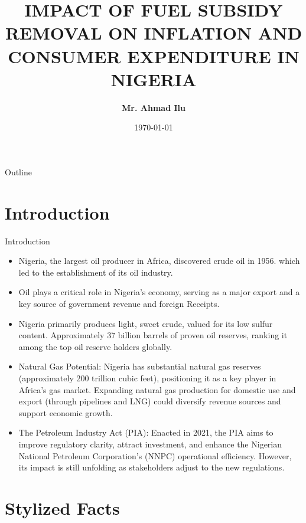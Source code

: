 \documentclass{beamer}
\title [Energy Subsidy]{IMPACT OF FUEL SUBSIDY REMOVAL ON INFLATION AND CONSUMER EXPENDITURE IN NIGERIA}
\institute[Economist]{\textbf{Economist / Policy Researcher} \\
\vspace{8mm}
\url{iluahmad9@gmail.com} \\
\url{https://iluahmad.github.io} \\
\vspace{8mm}
\textbf{Working Paper Series: XXX03}}
\author{\textbf{Mr. Ahmad Ilu}}
\date{\today}
\begin{document}
  {
 


\begin{frame}  
    \titlepage
\end{frame}

\begin{frame}{Outline}
    \tableofcontents
\end{frame}

\section{Introduction}

\begin{frame}{Introduction}
    \begin{itemize}
        \item Nigeria, the largest oil producer in Africa, discovered crude oil in 1956. which led to the establishment of its oil industry.
        \item Oil plays a critical role in Nigeria’s economy, serving as a major export and a key source of government revenue and foreign Receipts.
        \item Nigeria primarily produces light, sweet crude, valued for its low sulfur content. Approximately 37 billion barrels of proven oil reserves, ranking it among the top oil reserve holders globally. 
        \item Natural Gas Potential: Nigeria has substantial natural gas reserves (approximately 200 trillion cubic feet), positioning it as a key player in Africa’s gas market. Expanding natural gas production for domestic use and export (through pipelines and LNG) could diversify revenue sources and support economic growth.
        \item The Petroleum Industry Act (PIA): Enacted in 2021, the PIA aims to improve regulatory clarity, attract investment, and enhance the Nigerian National Petroleum Corporation’s (NNPC) operational efficiency. However, its impact is still unfolding as stakeholders adjust to the new regulations.
    \end{itemize}
\end{frame}
\section{Stylized Facts}

}
\end{document}
